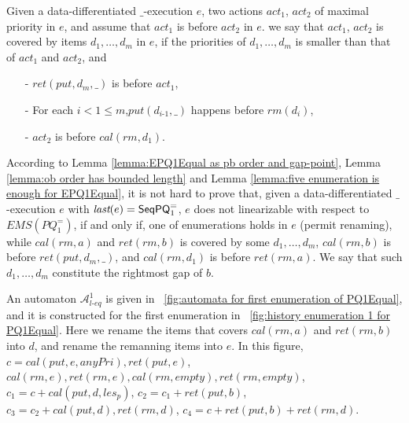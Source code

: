 Given a data-differentiated $\_$-execution $e$, two actions $\textit{act}_1$, $\textit{act}_2$ of maximal priority in $e$, and assume that $\textit{act}_1$ is before $\textit{act}_2$ in $e$.
we say that $\textit{act}_1$, $\textit{act}_2$ is covered by items $d_1,\ldots,d_m$ in $e$, if the priorities of $d_1,\ldots,d_m$ is smaller than that of $\textit{act}_1$ and $\textit{act}_2$, and

\begin{itemize}
\setlength{\itemsep}{0.5pt}
\item[-] $\textit{ret}(\textit{put},d_m,\_)$ is before $\textit{act}_1$,

\item[-] For each $i < 1 \leq m$,$\textit{put}(d_{\textit{i-1}},\_)$ happens before $\textit{rm}(d_i)$,

\item[-] $\textit{act}_2$ is before $\textit{cal}(\textit{rm},d_1)$.
\end{itemize}

According to Lemma \ref{lemma:EPQ1Equal as pb order and gap-point}, Lemma \ref{lemma:ob order has bounded length} and Lemma \ref{lemma:five enumeration is enough for EPQ1Equal}, it is not hard to prove that, given a data-differentiated $\_$-execution $e$ with $\textit{last}(e) = \mathsf{SeqPQ}_1^{=}$, $e$ does not linearizable with respect to $\textit{EMS}(\textit{PQ}_1^{=})$, if and only if, one of enumerations holds in $e$ (permit renaming), while $\textit{cal}(\textit{rm},a)$ and $\textit{ret}(\textit{rm},b)$ is covered by some $d_1,\ldots,d_m$, $\textit{cal}(\textit{rm},b)$ is before $\textit{ret}(\textit{put},d_m,\_)$, and $\textit{cal}(\textit{rm},d_1)$ is before $\textit{ret}(\textit{rm},a)$. We say that such $d_1,\ldots,d_m$ constitute the rightmost gap of $b$.


An automaton $\mathcal{A}_{\textit{l-eq}}^1$ is given in \figurename~\ref{fig:automata for first enumeration of PQ1Equal}, and it is constructed for the first enumeration in \figurename~\ref{fig:history enumeration 1 for PQ1Equal}. Here we rename the items that covers $\textit{cal}(\textit{rm},a)$ and $\textit{ret}(\textit{rm},b)$ into $d$, and rename the remanning items into $e$. In this figure, $c = \textit{cal}(\textit{put},e,\textit{anyPri}),\textit{ret}(\textit{put},e)$, $\textit{cal}(\textit{rm},e), \textit{ret}(\textit{rm},e),\textit{cal}(\textit{rm},\textit{empty}),\textit{ret}(\textit{rm},\textit{empty})$, $c_1 = c + \textit{cal}(\textit{put},d,\textit{les}_p)$, $c_2 = c_1 + \textit{ret}(\textit{put},b)$, $c_3 = c_2 + \textit{cal}(\textit{put},d),\textit{ret}(\textit{rm},d)$, $c_4 = c + \textit{ret}(\textit{put},b) + \textit{ret}(\textit{rm},d)$.


